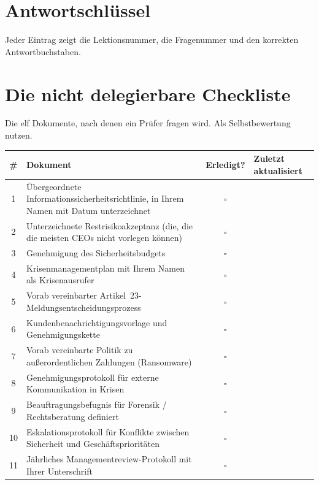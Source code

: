 \documentclass[11pt,a4paper,twoside]{book}
\begin{document}

\appendix
\immediate\closeout\answerfile

\chapter{Antwortschlüssel}

Jeder Eintrag zeigt die Lektionsnummer, die Fragenummer und den korrekten Antwortbuchstaben.

\bigskip


\newpage

\chapter{Die nicht delegierbare Checkliste}

Die elf Dokumente, nach denen ein Prüfer fragen wird. Als Selbstbewertung nutzen.

\begin{center}
\renewcommand{\arraystretch}{1.4}
\begin{tabularx}{\linewidth}{@{}cXcl@{}}
\toprule
\textbf{\#} & \textbf{Dokument} & \textbf{Erledigt?} & \textbf{Zuletzt aktualisiert} \\
\midrule
1 & Übergeordnete Informationssicherheitsrichtlinie, in Ihrem Namen mit Datum unterzeichnet & $\square$ & \\
2 & Unterzeichnete Restrisikoakzeptanz (die, die die meisten CEOs nicht vorlegen können) & $\square$ & \\
3 & Genehmigung des Sicherheitsbudgets & $\square$ & \\
4 & Krisenmanagementplan mit Ihrem Namen als Krisenausrufer & $\square$ & \\
5 & Vorab vereinbarter Artikel~23-Meldungsentscheidungsprozess & $\square$ & \\
6 & Kundenbenachrichtigungsvorlage und Genehmigungskette & $\square$ & \\
7 & Vorab vereinbarte Politik zu außerordentlichen Zahlungen (Ransomware) & $\square$ & \\
8 & Genehmigungsprotokoll für externe Kommunikation in Krisen & $\square$ & \\
9 & Beauftragungsbefugnis für Forensik / Rechtsberatung definiert & $\square$ & \\
10 & Eskalationsprotokoll für Konflikte zwischen Sicherheit und Geschäftsprioritäten & $\square$ & \\
11 & Jährliches Managementreview-Protokoll mit Ihrer Unterschrift & $\square$ & \\
\bottomrule
\end{tabularx}
\end{center}
\end{document}
